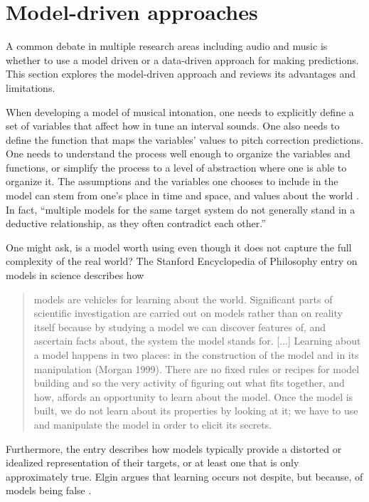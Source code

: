 \section{Model-driven approaches}
A common debate in multiple research areas including audio and music is whether to use a model driven or a data-driven approach for making predictions. This section explores the model-driven approach and reviews its advantages and limitations. 

When developing a model of musical intonation, one needs to explicitly define a set of variables that affect how in tune an interval sounds. One also needs to define the function that maps the variables' values to pitch correction predictions. One needs to understand the process well enough to organize the variables and functions, or simplify the process to a level of abstraction where one is able to organize it. The assumptions and the variables one chooses to include in the model can stem from one's place in time and space, and values about the world \cite{bacharach1989organizational}. In fact, ``multiple models for the same target system do not generally stand in a deductive relationship, as they often contradict each other.'' \cite{sep-models-science} 

One might ask, is a model worth using even though it does not capture the full complexity of the real world? The Stanford Encyclopedia of Philosophy entry on models in science describes how \begin{quote}models are vehicles for learning about the world. Significant parts of scientific investigation are carried out on models rather than on reality itself because by studying a model we can discover features of, and ascertain facts about, the system the model stands for. [...] Learning about a model happens in two places: in the construction of the model and in its manipulation (Morgan 1999). There are no fixed rules or recipes for model building and so the very activity of figuring out what fits together, and how, affords an opportunity to learn about the model. Once the model is built, we do not learn about its properties by looking at it; we have to use and manipulate the model in order to elicit its secrets. \cite{sep-models-science}\end{quote} Furthermore, the entry describes how models typically provide a distorted or idealized representation of their targets, or at least one that is only approximately true. Elgin argues that learning occurs not despite, but because, of models being false \cite{elgin2017true}. 

